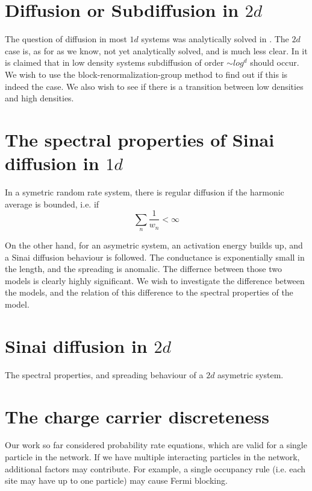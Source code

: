 \section{Diffusion or Subdiffusion in $2d$}

The question of diffusion in most $1d$ systems was analytically solved in \cite{Alexander:1981:RMP}. The $2d$ case is, as for as we know, not yet analytically solved, and is much less clear. In \cite{Amir:2010:PRL} it is claimed that in low density systems subdiffusion of order $\sim log^d$ should occur. We wish to use the block-renormalization-group method to find out if this is indeed the case. We also wish to see if there is a transition between low densities and high densities.



\section{The spectral properties of Sinai diffusion in $1d$}

In a symetric random rate system, there is regular diffusion if the harmonic average is bounded, i.e. if
\[ \sum_n \frac{1}{w_n} < \infty \]

On the other hand, for an asymetric system, an activation energy builds up, and a Sinai diffusion behaviour is followed.
The conductance is exponentially small in the length, and the spreading is anomalic. The differnce between those two models is clearly highly significant. We wish to investigate the difference between the models, and the relation of this difference to the spectral properties of the model.

\section{Sinai diffusion in $2d$}

The spectral properties, and spreading behaviour of a $2d$ asymetric system.


\section{The charge carrier discreteness}\label{sec:discreteness}

Our work so far considered probability rate equations, which are valid for a single particle in the network.
If we have multiple interacting particles in the network, additional factors may contribute. For example,
a single occupancy rule (i.e. each site may have up to one particle) may cause Fermi blocking.

